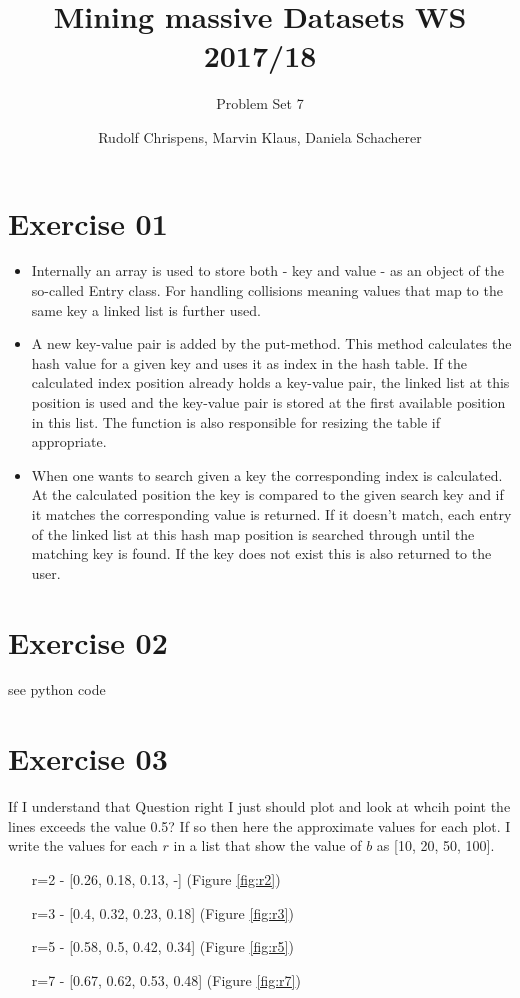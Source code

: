 \documentclass[11pt,a4paper]{scrartcl}
\title{Mining massive Datasets WS 2017/18}
\subtitle{Problem Set 7}
\author{Rudolf Chrispens, Marvin Klaus, Daniela Schacherer}
\begin{document}
\maketitle

\section*{Exercise 01}

\begin{itemize}
	\item Internally an array is used to store both - key and value - as an object of the so-called Entry class. For handling collisions meaning values that map to the same key a linked list is further used. 
	\item A new key-value pair is added by the put-method. This method calculates the hash value for a given key and uses it as index in the hash table. If the calculated index position already holds a key-value pair, the linked list at this position is used and the key-value pair is stored at the first available position in this list. The function is also responsible for resizing the table if appropriate.
	\item When one wants to search given a key the corresponding index is calculated. At the calculated position the key is compared to the given search key and if it matches the corresponding value is returned. If it doesn't match, each entry of the linked list at this hash map position is searched through until the matching key is found. If the key does not exist this is also returned to the user.
\end{itemize} 

\section*{Exercise 02}
see python code

\section*{Exercise 03}

If I understand that Question right I just should plot and look at whcih point the lines exceeds the value 0.5? If so then here the approximate values for each plot. I write the values for each $r$ in a list that show the value of $b$ as [10, 20, 50, 100].

\begin{itemize}
    \item [r=2] - [0.26, 0.18, 0.13, -] (Figure \ref{fig:r2})
    \item [r=3] - [0.4, 0.32, 0.23, 0.18] (Figure \ref{fig:r3})
    \item [r=5] - [0.58, 0.5, 0.42, 0.34] (Figure \ref{fig:r5})
    \item [r=7] - [0.67, 0.62, 0.53, 0.48] (Figure \ref{fig:r7})
\end{itemize}
\end{document}
